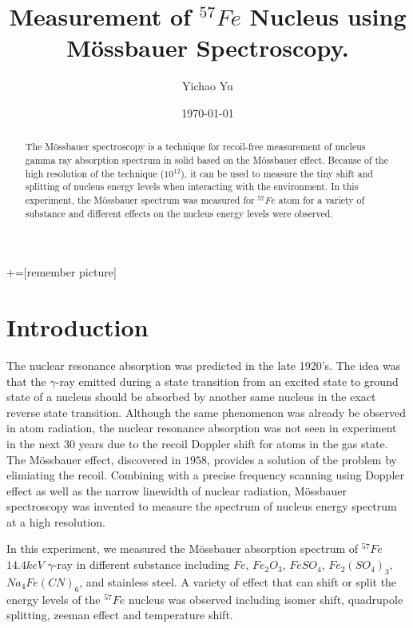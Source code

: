 \documentclass[aps,twocolumn,secnumarabic,balancelastpage,amsmath,amssymb,nofootinbib]{revtex4}
\begin{document}
+=[remember picture]
\title{Measurement of ${}^{57}Fe$ Nucleus using M\"{o}ssbauer Spectroscopy.}
\author{Yichao Yu}
\date{\today}

\begin{abstract}
  The M\"{o}ssbauer spectroscopy is a technique for recoil-free measurement of nucleus gamma ray absorption spectrum in solid based on the M\"{o}ssbauer effect. Because of the high resolution of the technique ($10^{12}$), it can be used to measure the tiny shift and splitting of nucleus energy levels when interacting with the environment. In this experiment, the M\"{o}ssbauer spectrum was measured for ${^{57}Fe}$ atom for a variety of substance and different effects on the nucleus energy levels were observed.
\end{abstract}

\maketitle
\section*{Introduction}
The nuclear resonance absorption was predicted in the late 1920's\cite{first_attempt}. The idea was that the $\gamma$-ray emitted during a state transition from an excited state to ground state of a nucleus should be absorbed by another same nucleus in the exact reverse state transition. Although the same phenomenon was already be observed in atom radiation, the nuclear resonance absorption was not seen in experiment in the next $30$ years due to the recoil Doppler shift for atoms in the gas state. The M\"{o}ssbauer effect, discovered in $1958$, provides a solution of the problem by elimiating the recoil. Combining with a precise frequency scanning using Doppler effect as well as the narrow linewidth of nuclear radiation, M\"{o}ssbauer spectroscopy was invented to measure the spectrum of nucleus energy spectrum at a high resolution.

In this experiment, we measured the M\"{o}ssbauer absorption spectrum of ${}^{57}Fe$ $14.4keV$ $\gamma$-ray in different substance including $Fe$, $Fe_2O_3$, $FeSO_4$, $Fe_2(SO_4)_3$, $Na_4Fe(CN)_6$, and stainless steel. A variety of effect that can shift or split the energy levels of the ${}^{57}Fe$ nucleus was observed including isomer shift, quadrupole splitting, zeeman effect and temperature shift.
\end{document}
